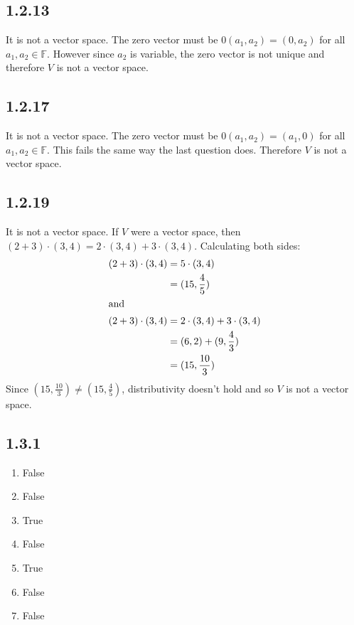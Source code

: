 \documentclass[12pt,titlepage]{extarticle}
\begin{document}
\subsection*{1.2.13}
It is not a vector space. The zero vector must be $0 (a_1, a_2) = (0, a_2)$ for all $a_1, a_2 \in \mathbb{F}$. However since $a_2$ is variable, the zero vector is not unique and therefore $V$ is not a vector space.

\subsection*{1.2.17}
It is not a vector space. The zero vector must be $0 (a_1, a_2) = (a_1, 0)$ for all $a_1, a_2 \in \mathbb{F}$. This fails the same way the last question does. Therefore $V$ is not a vector space.

\subsection*{1.2.19}
It is not a vector space. If $V$ were a vector space, then $(2+3) \cdot (3,4) = 2\cdot (3, 4) + 3\cdot (3,4)$. Calculating both sides:
\begin{align*}
	(2 + 3) \cdot (3,4) &= 5 \cdot (3,4) \\
	&= (15, \frac{4}{5}) \\
	\intertext{and}
	(2+3) \cdot (3,4) &= 2\cdot (3,4) + 3\cdot (3,4) \\
					  &= (6, 2) + (9, \frac{4}{3}) \\
					  &= (15, \frac{10}{3})
\end{align*}
Since $(15, \frac{10}{3}) \neq (15, \frac{4}{5})$, distributivity doesn't hold and so $V$ is not a vector space.

\subsection*{1.3.1}
\begin{multicols}{2}
	\begin{enumerate}[label=\alph*)]
		\item False
		\item False
		\item True
		\item False
		\item True
		\item False
		\item False
	\end{enumerate}
\end{multicols}
\end{document}
